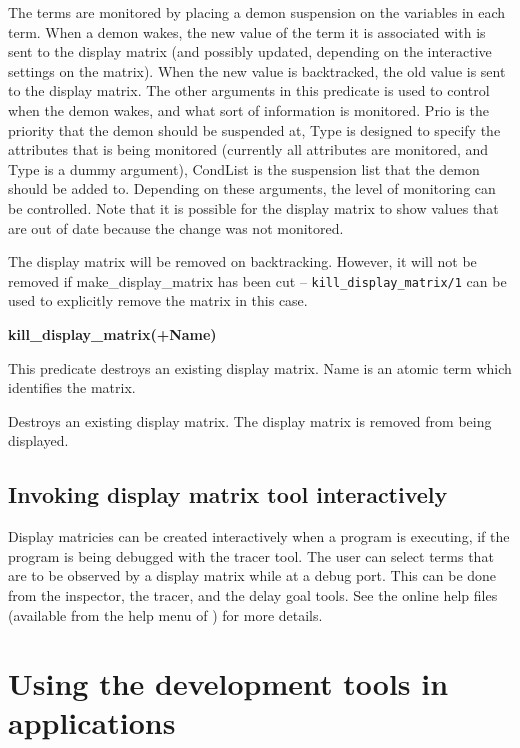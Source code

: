    The terms are monitored by placing a demon suspension on the variables
   in each term. When a demon wakes, the new value of the term it is
   associated with is sent to the display matrix (and possibly updated,
   depending on the interactive settings on the matrix). When the new 
   value is backtracked, the old value is sent to the display matrix.
   The other arguments in this predicate is used to control when the
   demon wakes, and what sort of information is monitored. Prio is the
   priority that the demon should be suspended at, Type is designed to
   specify the attributes that is being monitored (currently all 
   attributes are monitored, and Type is a dummy argument), CondList is 
   the suspension list that the demon should be added to. Depending on
   these arguments, the level of monitoring can be controlled. Note that
   it is possible for the display matrix to show values that are out of
   date because the change was not monitored. 

   The display matrix will be removed on backtracking. However, it will 
   not be removed if make_display_matrix has been
   cut -- \verb'kill_display_matrix/1' can be used to explicitly remove the
   matrix in this case.

\medskip
{\bf kill_display_matrix(+Name)}

This predicate destroys an existing
   display matrix. Name is an atomic term which identifies the matrix.

   Destroys an existing display matrix. The display matrix is removed
   from being displayed.


\subsection{Invoking display matrix tool interactively}

Display matricies can be created interactively when a program is
executing, if the program is being debugged with the tracer tool. The user
can select terms that are to be observed by a display matrix while at a
debug port. This can be done from the inspector, the tracer, and the delay
goal tools. See the online help files (available from the help menu of
{\tkeclipse}) for more details.

\section{Using the development tools in applications}

